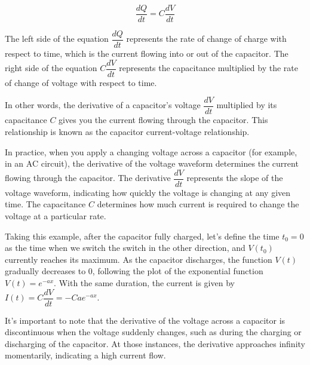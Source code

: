 \documentclass[13pt,a4paper]{report}
\begin{document}
$$\dfrac{dQ}{dt}=C\dfrac{dV}{dt}$$

The left side of the equation $\dfrac{dQ}{dt}$ represents the rate of change of charge with respect to time, which is the current flowing into or out of the capacitor. The right side of the equation $C\dfrac{dV}{dt}$ represents the capacitance multiplied by the rate of change of voltage with respect to time.

In other words, the derivative of a capacitor's voltage $\dfrac{dV}{dt}$ multiplied by its capacitance $C$ gives you the current flowing through the capacitor. This relationship is known as the capacitor current-voltage relationship.

In practice, when you apply a changing voltage across a capacitor (for example, in an AC circuit), the derivative of the voltage waveform determines the current flowing through the capacitor. The derivative $\dfrac{dV}{dt}$ represents the slope of the voltage waveform, indicating how quickly the voltage is changing at any given time. The capacitance $C$ determines how much current is required to change the voltage at a particular rate.

\begin{center}
\textcolor{black}{\fboxrule=2pt}
\end{center}

Taking this example, after the capacitor fully charged, let's define the time $t_0=0$ as the time when we switch the switch in the other direction, and $V(t_0)$ currently reaches its maximum. As the capacitor discharges, the function $V(t)$ gradually decreases to 0, following the plot of the exponential function $V(t)=e^{-ax}$. With the same duration, the current is given by $I(t)=C\dfrac{dV}{dt}=-Cae^{-ax}$.

It's important to note that the derivative of the voltage across a capacitor is discontinuous when the voltage suddenly changes, such as during the charging or discharging of the capacitor. At those instances, the derivative approaches infinity momentarily, indicating a high current flow.
\end{document}
